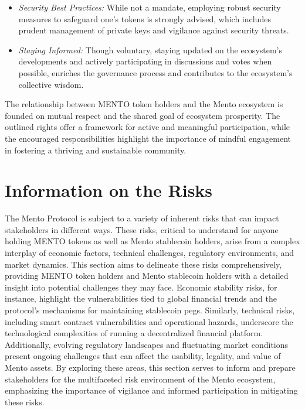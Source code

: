 \documentclass[a4paper]{article}
\theoremstyle{definition}
\begin{document}
\begin{itemize}
\begin{itemize}
        \item \textit{Security Best Practices:} While not a mandate, employing robust security measures to safeguard one's tokens is strongly advised, which includes prudent management of private keys and vigilance against security threats.
        
        \item \textit{Staying Informed:} Though voluntary, staying updated on the ecosystem’s developments and actively participating in discussions and votes when possible, enriches the governance process and contributes to the ecosystem's collective wisdom.
    \end{itemize}
\end{itemize}

The relationship between MENTO token holders and the Mento ecosystem is founded on mutual respect and the shared goal of ecosystem prosperity. The outlined rights offer a framework for active and meaningful participation, while the encouraged responsibilities highlight the importance of mindful engagement in fostering a thriving and sustainable community.

\section{Information on the Risks}
\label{sec:risks}
The Mento Protocol is subject to a variety of inherent risks that can impact stakeholders in different ways. These risks, critical to understand for anyone holding MENTO tokens as well as Mento stablecoin holders, arise from a complex interplay of economic factors, technical challenges, regulatory environments, and market dynamics. This section aims to delineate these risks comprehensively, providing MENTO token holders and Mento stablecoin holders with a detailed insight into potential challenges they may face. Economic stability risks, for instance, highlight the vulnerabilities tied to global financial trends and the protocol's mechanisms for maintaining stablecoin pegs. Similarly, technical risks, including smart contract vulnerabilities and operational hazards, underscore the technological complexities of running a decentralized financial platform. Additionally, evolving regulatory landscapes and fluctuating market conditions present ongoing challenges that can affect the usability, legality, and value of Mento assets. By exploring these areas, this section serves to inform and prepare stakeholders for the multifaceted risk environment of the Mento ecosystem, emphasizing the importance of vigilance and informed participation in mitigating these risks.
\end{document}
